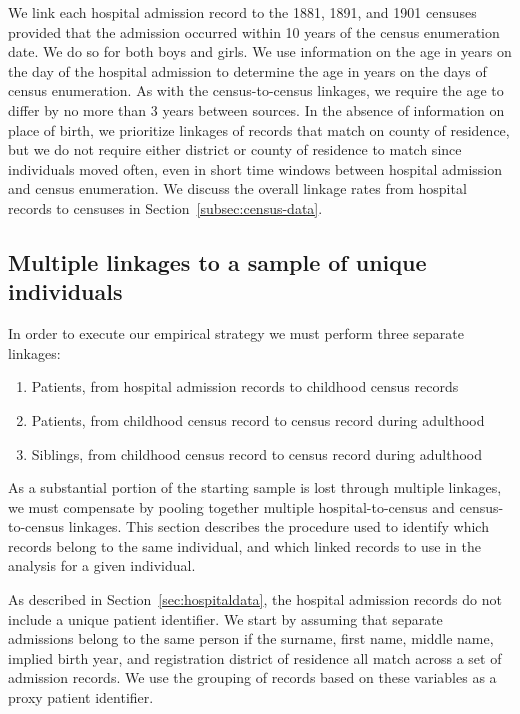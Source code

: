 \documentclass[12pt,english]{article}
\begin{document}
We link each hospital admission record to the 1881, 1891, and 1901 censuses provided that the admission occurred within 10 years of the census enumeration date. We do so for both boys and girls. We use information on the age in years on the day of the hospital admission to determine the age in years on the days of census enumeration. As with the census-to-census linkages, we require the age to differ by no more than 3 years between sources. In the absence of information on place of birth, we prioritize linkages of records that match on county of residence, but we do not require either district or county of residence to match since individuals moved often, even in short time windows between hospital admission and census enumeration. We discuss the overall linkage rates from hospital records to censuses in Section~\ref{subsec:census-data}.  

\subsection[Multiple linkages to a sample of unique individuals]{Multiple linkages to a sample of unique individuals\label{sec:resolve-unique-match}}

In order to execute our empirical strategy we must perform three separate linkages: 
\begin{enumerate}
	\item Patients, from hospital admission records to childhood census records
	\item Patients, from childhood census record to census record during adulthood
	\item Siblings, from childhood census record to census record during adulthood
\end{enumerate}
As a substantial portion of the starting sample is lost through multiple linkages, we must compensate by pooling together multiple hospital-to-census and census-to-census linkages. This section describes the procedure used to identify which records belong to the same individual, and which linked records to use in the analysis for a given individual. 

As described in Section~\ref{sec:hospitaldata}, the hospital admission records do not include a unique patient identifier. We start by assuming that separate admissions belong to the same person if the surname, first name, middle name, implied birth year, and registration district of residence all match across a set of admission records. We use the grouping of records based on these variables as a proxy patient identifier.
\end{document}
